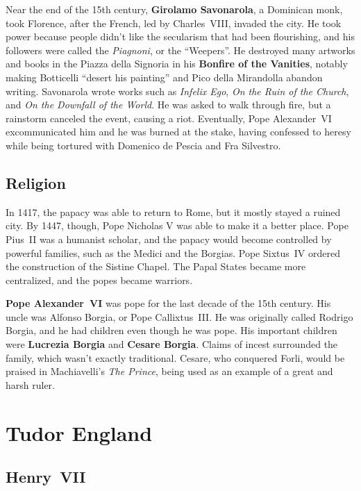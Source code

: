 Near the end of the 15th century, \textbf{Girolamo Savonarola}, a Dominican monk, took Florence,
after the French, led by Charles~VIII, invaded the city.
He took power because people didn't like the secularism that had been flourishing,
and his followers were called the \textit{Piagnoni}, or the ``Weepers''.
He destroyed many artworks and books in the Piazza della Signoria in his \textbf{Bonfire of the Vanities},
notably making Botticelli ``desert his painting'' and Pico della Mirandolla abandon writing.
Savonarola wrote works such as
\textit{Infelix Ego},
\textit{On the Ruin of the Church},
and \textit{On the Downfall of the World}.
He was asked to walk through fire, but a rainstorm canceled the event, causing a riot.
Eventually, Pope Alexander~VI excommunicated him and he was burned at the stake,
having confessed to heresy while being tortured with Domenico de Pescia and Fra Silvestro.

\subsection*{Religion}

In 1417, the papacy was able to return to Rome, but it mostly stayed a ruined city.
By 1447, though, Pope Nicholas V was able to make it a better place.
Pope Pius~II was a humanist scholar, and the papacy would become controlled by powerful families,
such as the Medici and the Borgias.
Pope Sixtus~IV ordered the construction of the Sistine Chapel.
The Papal States became more centralized, and the popes became warriors.

\textbf{Pope Alexander~VI} was pope for the last decade of the 15th century.
His uncle was Alfonso Borgia, or Pope Callixtus~III\@.
He was originally called Rodrigo Borgia, and he had children even though he was pope.
His important children were \textbf{Lucrezia Borgia} and \textbf{Cesare Borgia}.
Claims of incest surrounded the family, which wasn't exactly traditional.
Cesare, who conquered Forli, would be praised in Machiavelli's \textit{The Prince},
being used as an example of a great and harsh ruler.

\section{Tudor England}

\subsection*{Henry~VII}

